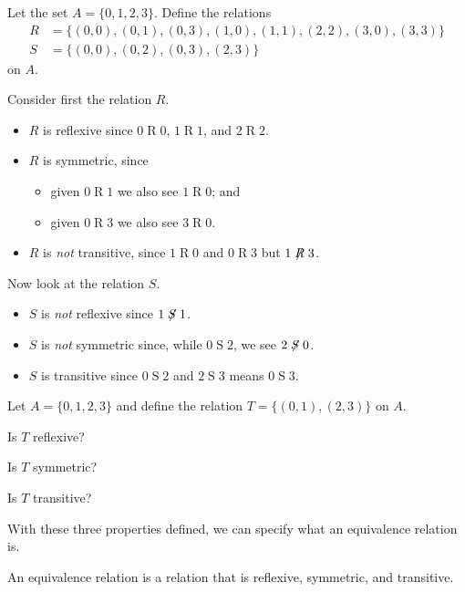 \begin{example}
    Let the set $A = \{0,1,2,3\}$. Define the relations
    \begin{align*}
        R &= \{(0,0),(0,1),(0,3),(1,0),(1,1),(2,2),(3,0),(3,3)\}\\
        S &= \{(0,0),(0,2),(0,3),(2,3)\}
    \end{align*}
    on $A$.

    Consider first the relation $R$.
    \begin{itemize}
        \item $R$ is reflexive since $0\mathrel{R}0$, $1\mathrel{R}1$, and $2\mathrel{R}2$.
        \item $R$ is symmetric, since
        \begin{itemize}
            \item given $0\mathrel{R}1$ we also see $1\mathrel{R}0$; and
            \item given $0\mathrel{R}3$ we also see $3\mathrel{R}0$.
        \end{itemize}
        \item $R$ is \textit{not} transitive, since $1\mathrel{R}0$ and $0\mathrel{R}3$ but $1\not\mathrel{R}3$.
    \end{itemize}

    Now look at the relation $S$.
    \begin{itemize}
        \item $S$ is \textit{not} reflexive since $1\not\mathrel{S}1$.
        \item $S$ is \textit{not} symmetric since, while $0\mathrel{S}2$, we see $2\not\mathrel{S}0$.
        \item $S$ is transitive since $0\mathrel{S}2$ and $2\mathrel{S}3$ means $0\mathrel{S}3$.
    \end{itemize}
\end{example}

\begin{exercise}
    Let $A = \{0, 1, 2, 3\}$ and define the relation $T = \{(0, 1), (2, 3)\}$ on $A$.
    \begin{partquestions}{\alph*}
        \item Is $T$ reflexive?
        \item Is $T$ symmetric?
        \item Is $T$ transitive?
    \end{partquestions}
\end{exercise}

With these three properties defined, we can specify what an equivalence relation is.
\begin{definition}
    An equivalence relation is a relation that is reflexive, symmetric, and transitive.
\end{definition}

